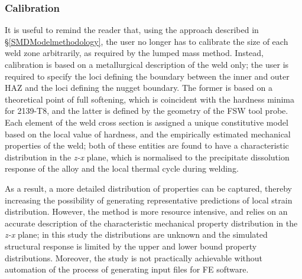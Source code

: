 \subsubsection{Calibration}
\label{SMDModellingstudyDiscussionPropertydistributionsCalibration}
It is useful to remind the reader that, using the approach described in \S\ref{SMDModelmethodology}, the user no longer has to calibrate the size of each weld zone arbitrarily, as required by the lumped mass method. Instead, calibration is based on a metallurgical description of the weld only; the user is required to specify the loci defining the boundary between the inner and outer HAZ and the loci defining the nugget boundary. The former is based on a theoretical point of full softening, which is coincident with the hardness minima for 2139-T8, and the latter is defined by the geometry of the FSW tool probe. Each element of the weld cross section is assigned a unique constitutive model based on the local value of hardness, and the empirically estimated mechanical properties of the weld; both of these entities are found to have a characteristic distribution in the \textit{z-x} plane, which is normalised to the precipitate dissolution response of the alloy and the local thermal cycle during welding. 

As a result, a more detailed distribution of properties can be captured, thereby increasing the possibility of generating representative predictions of local strain distribution. However, the method is more resource intensive, and relies on an accurate description of the characteristic mechanical property distribution in the \textit{z-x} plane; in this study the distributions are unknown and the simulated structural response is limited by the upper and lower bound property distributions. Moreover, the study is not practically achievable without automation of the process of generating input files for FE software. 

